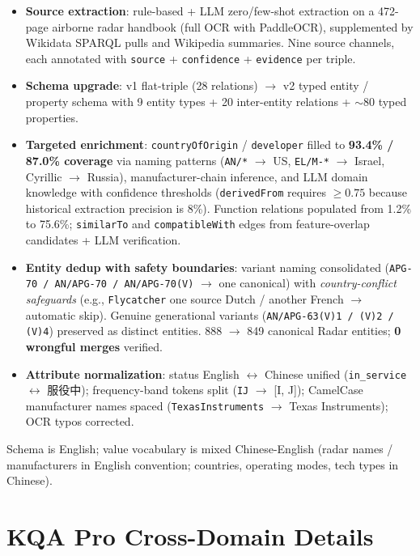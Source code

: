 \documentclass[11pt,a4paper]{article}
\begin{document}
\begin{itemize}[topsep=0pt,itemsep=2pt,leftmargin=*]
  \item \textbf{Source extraction}: rule-based + LLM zero/few-shot extraction on a 472-page airborne radar handbook (full OCR with PaddleOCR), supplemented by Wikidata \citep{vrandecic2014wikidata} SPARQL pulls and Wikipedia summaries. Nine source channels, each annotated with \texttt{source} + \texttt{confidence} + \texttt{evidence} per triple.
  \item \textbf{Schema upgrade}: v1 flat-triple (28 relations) $\to$ v2 typed entity / property schema with 9 entity types + 20 inter-entity relations + ${\sim}80$ typed properties.
  \item \textbf{Targeted enrichment}: \texttt{countryOfOrigin} / \texttt{developer} filled to \textbf{93.4\% / 87.0\% coverage} via naming patterns (\texttt{AN/*} $\to$ US, \texttt{EL/M-*} $\to$ Israel, Cyrillic $\to$ Russia), manufacturer-chain inference, and LLM domain knowledge with confidence thresholds (\texttt{derivedFrom} requires $\geq 0.75$ because historical extraction precision is 8\%). Function relations populated from 1.2\% to 75.6\%; \texttt{similarTo} and \texttt{compatibleWith} edges from feature-overlap candidates + LLM verification.
  \item \textbf{Entity dedup with safety boundaries}: variant naming consolidated (\texttt{APG-70 / AN/APG-70 / AN/APG-70(V)} $\to$ one canonical) with \emph{country-conflict safeguards} (e.g., \texttt{Flycatcher} one source Dutch / another French $\to$ automatic skip). Genuine generational variants (\texttt{AN/APG-63(V)1 / (V)2 / (V)4}) preserved as distinct entities. 888 $\to$ 849 canonical Radar entities; \textbf{0 wrongful merges} verified.
  \item \textbf{Attribute normalization}: status English $\leftrightarrow$ Chinese unified (\texttt{in\_service} $\leftrightarrow$ 服役中); frequency-band tokens split (\texttt{IJ} $\to$ [I, J]); CamelCase manufacturer names spaced (\texttt{TexasInstruments} $\to$ Texas Instruments); OCR typos corrected.
\end{itemize}

Schema is English; value vocabulary is mixed Chinese-English (radar names / manufacturers in English convention; countries, operating modes, tech types in Chinese).

\section{KQA Pro Cross-Domain Details}
\label{app:kqapro}
\end{document}
